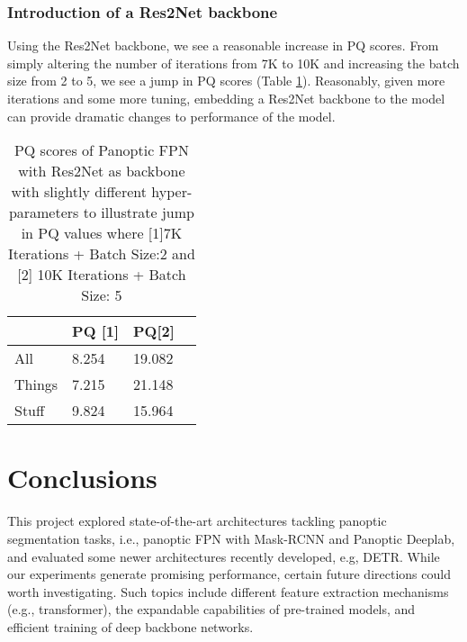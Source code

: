 \documentclass[10pt,twocolumn,letterpaper]{article}
\begin{document}
\subsubsection{Introduction of a Res2Net backbone}

Using the Res2Net backbone, we see a reasonable increase in PQ scores. From simply altering the number of iterations from 7K to 10K and increasing the batch size from 2 to 5, we see a jump in PQ scores (Table \ref{tab:mod_resnet}). Reasonably, given more iterations and some more tuning, embedding a Res2Net backbone to the model can provide dramatic changes to performance of the model.

\begin{table}[htbp]\centering
\begin{tabular}{ || m{3em} | m{1cm}| m{1cm} | m{1cm} || } 
  \hline
   & PQ [1] & PQ[2]\\ 
  \hline
  All & 8.254 & 19.082 \\ 
  \hline
  Things & 7.215 & 21.148 \\ 
  \hline
  Stuff & 9.824 & 15.964\\ 
  \hline
\end{tabular}
\caption{PQ scores of Panoptic FPN with Res2Net as backbone with slightly different hyper-parameters to illustrate jump in PQ values where [1]7K Iterations + Batch Size:2 and [2] 10K Iterations + Batch Size: 5}
\label{tab:mod_resnet}
\end{table}



\section{Conclusions}

This project explored state-of-the-art architectures tackling panoptic segmentation tasks, i.e., panoptic FPN with Mask-RCNN and Panoptic Deeplab, and evaluated some newer architectures recently developed, e.g, DETR. While our experiments generate promising performance, certain future directions could worth investigating. Such topics include different feature extraction mechanisms (e.g., transformer), the expandable capabilities of pre-trained models, and efficient training of deep backbone networks.  

\end{document}
